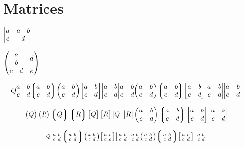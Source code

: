 \documentclass{article}
\begin{document}
\newpage


\section*{Matrices}

$  \mqty*|a & \mqty*{a & b} \\ c& d| $

$
\begin{pmatrix}
  \mqty{a\\b} & d\\
  \mqty{c & d} & e
\end{pmatrix}
$


\[
  \matrixquantity{Q}
  \matrixquantity*{a & b \\ c & d}
  \matrixquantity*(a & b \\ c & d)
  \matrixquantity(a & b \\ c & d)
  \matrixquantity[a & b \\ c & d]
  \matrixquantity|a & b \\ c & d|
  \mqty{a & b \\ c & d}
  \mqty(a & b \\ c & d)
  \mqty*(a & b \\ c & d)
  \mqty[a & b \\ c & d]
  \mqty|a & b \\ c & d|
  \mqty*|a & b\\ c& d|
\]

\[
  \pmqty{Q} \mqty(R)
  \Pmqty{Q} \mqty*(R)
  \bmqty{Q} \mqty[R]
  \vmqty{Q} \mqty|R|
  \pmqty{a & b \\ c & d}
  \Pmqty{a & b \\ c & d}
  \bmqty{a & b \\ c & d}
  \vmqty{a & b \\ c & d}
\]

\[
  \smallmatrixquantity{Q}
  \smallmatrixquantity*{a & b \\ c & d}
  \smallmatrixquantity*(a & b \\ c & d)
  \smallmatrixquantity(a & b \\ c & d)
  \smallmatrixquantity[a & b \\ c & d]
  \smallmatrixquantity|a & b \\ c & d|
  \smqty{a & b \\ c & d}
  \smqty(a & b \\ c & d)
  \smqty*(a & b \\ c & d)
  \smqty[a & b \\ c & d]
  \smqty|a & b \\ c & d|
\]
\end{document}
